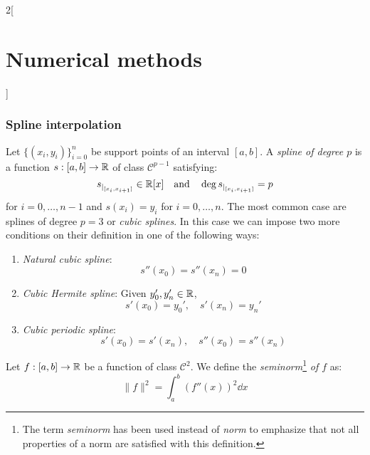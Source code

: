 \documentclass[../../../main.tex]{subfiles}
\begin{document}
\begin{multicols}{2}[\section{Numerical methods}]
    \subsubsection*{Spline interpolation}
    \begin{center}
        \begin{minipage}{\linewidth}
            \centering
            
        \end{minipage}
    \end{center}
    \begin{definition}[Spline]
        Let $\{(x_i,y_i)\}_{i=0}^n$ be support points of an interval $[a,b]$. A \textit{spline of degree $p$} is a function $s:[a,b]\rightarrow\mathbb{R}$ of class $\mathcal{C}^{p-1}$ satisfying: $$s_{{|_{[x_i,x_{i+1}]}}}\in\mathbb{R}[x]\quad\text{and}\quad\deg s_{|_{[x_i,x_{i+1}]}}=p$$ for $i=0,\ldots,n-1$ and $s(x_i)=y_i$ for $i=0,\ldots,n$. The most common case are splines of degree  $p=3$ or \textit{cubic splines}. In this case we can impose two more conditions on their definition in one of the following ways:
        \begin{enumerate}
            \item \textit{Natural cubic spline}: $$s''(x_0)=s''(x_n)=0$$
            \item \textit{Cubic Hermite spline}: Given $y_0',y_n'\in\mathbb{R}$, $$s'(x_0)=y_0',\quad s'(x_n)=y_n'$$
            \item \textit{Cubic periodic spline}: $$s'(x_0)=s'(x_n),\quad s''(x_0)=s''(x_n)$$
        \end{enumerate}
    \end{definition}
    \begin{definition}
        Let $f:[a,b]\rightarrow\mathbb{R}$ be a function of class $\mathcal{C}^2$. We define the \textit{seminorm}\footnote{The term \textit{seminorm} has been used instead of \textit{norm} to emphasize that not all properties of a norm are satisfied with this definition.} \textit{of $f$} as: $$\|f\|^2=\int_a^b(f''(x))^2\dd x$$
    \end{definition}
    \begin{prop}

\end{prop}
\end{multicols}
\end{document}
